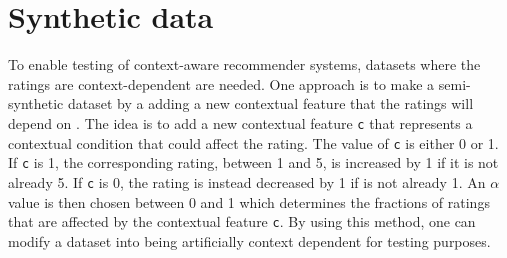 \section{Synthetic data}
To enable testing of context-aware recommender systems, datasets where the ratings are context-dependent are needed.
One approach is to make a semi-synthetic dataset by a adding a new contextual feature that the ratings will depend on \cite{baltrunasContextItemSplit}.
The idea is to add a new contextual feature \texttt{c} that represents a contextual condition that could affect the rating.
The value of \texttt{c} is either 0 or 1. 
If \texttt{c} is 1, the corresponding rating, between 1 and 5, is increased by 1 if it is not already 5.
If \texttt{c} is 0, the rating is instead decreased by 1 if is not already 1.
An $\alpha$ value is then chosen between 0 and 1 which determines the fractions of ratings that are affected by the contextual feature \texttt{c}.
By using this method, one can modify a dataset into being artificially context dependent for testing purposes.
